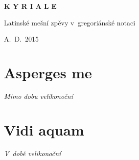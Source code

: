 \documentclass[12pt]{article} %
\newcommand{\info}[2]{{\textsc{#1}\hfill{\em #2}}}
\begin{document}
\begin{titlepage}
  \begin{center}

    { \vspace*{60 mm} }
    \begin{Huge}\textbf{K Y R I A L E}\end{Huge}

    \vspace{30 mm}
    \begin{Large}{Latinské mešní zpěvy v~gregoriánské notaci}\end{Large}

    \vspace{110 mm}
    \begin{large}{A.~D.~2015}\end{large}

  \end{center}
\end{titlepage}


\newpage
\thispagestyle{empty}
\mbox{}
\setcounter{page}{0}





\def\greinitialformat#1{{\fontsize{43}{43}\selectfont #1}}

\redlines




\newpage
\section{Asperges me}
\info{}{Mimo dobu velikonoční}

\vspace{0.5 cm}

\vspace{1 cm}




\section{Vidi aquam}
\info{}{V~době velikonoční}
\end{document}

